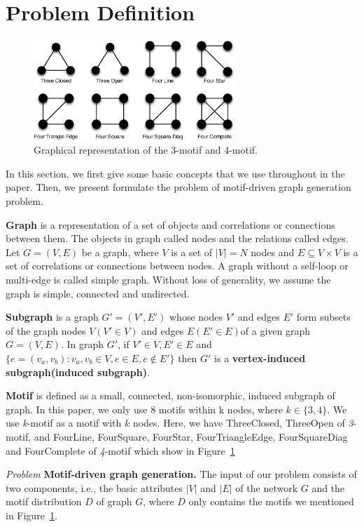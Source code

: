 \section{Problem Definition}
\label{sec:problem}

\begin{figure}[t]
\centering
\includegraphics[width=3in]{Figures/motifs.eps}
\caption{Graphical representation of the 3-motif and 4-motif.}
\label{fig:motif}
\end{figure}

In this section, we first give some basic concepts that we use throughout in the paper. Then, we present formulate the problem of motif-driven graph generation problem. 

\textbf{Graph} is a representation of a set of objects and correlations or connections between them. The objects in graph called nodes and the relations called edges. Let $G = (V, E)$ be a graph, where $V$ is a set of $|V| = N$ nodes and $E \subseteq V \times V$ is a set of correlations or connections between nodes. A graph without a self-loop or multi-edge is called simple graph. Without loss of generality, we assume the graph is simple, connected and undirected.

\textbf{Subgraph} is a graph $G' = (V', E')$ whose nodes $V'$ and edges $E'$ form subsets of the graph nodes $V(V' \in V)$ and edges $E(E' \in E)$of a given graph $G = (V, E)$. In graph $G'$, if $V' \in V, E' \in E$ and $\{e = (v_a, v_b) : v_a, v_b \in V, e \in E, e \not\in E'\}$ then $G'$ is a \textbf{vertex-induced subgraph(induced subgraph)}.

\textbf{Motif} is defined as a small, connected, non-isomorphic, induced subgraph of graph. In this paper, we only use 8 motifs within k nodes, where $k \in \{3, 4\}$. We use \textit{k}-motif as a motif with $k$ nodes. Here, we have ThreeClosed, ThreeOpen of \textit{3}-motif, and FourLine, FourSquare, FourStar, FourTriangleEdge, FourSquareDiag and FourComplete of \textit{4}-motif which show in Figure~\ref{fig:motif}

\emph{Problem } \textbf{Motif-driven graph generation.} 
 The input of our problem consists of two components, i.e., the basic attributes $|V|$ and $|E|$ of the network $G$ and the motif distribution $D$ of graph $G$, where $D$ only contains the motifs we mentioned in Figure~\ref{fig:motif}. 

